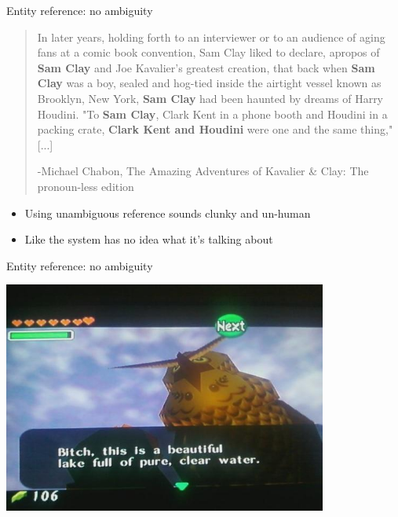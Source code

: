 \documentclass[10pt, compress]{beamer}		%
\begin{document}
\begin{frame}{Entity reference: no ambiguity}
	\begin{quote}
		In later years, holding forth to an interviewer or to an audience of aging fans at a comic book convention, Sam Clay liked to declare, apropos of \textbf{Sam Clay} and Joe Kavalier's greatest creation, that back when \textbf{Sam Clay} was a boy, sealed and hog-tied inside the airtight vessel known as Brooklyn, New York, \textbf{Sam Clay} had been haunted by dreams of Harry Houdini. "To \textbf{Sam Clay}, Clark Kent in a phone booth and Houdini in a packing crate, \textbf{Clark Kent and Houdini} were one and the same thing,"[...]

		\medskip
		-Michael Chabon, The Amazing Adventures of Kavalier \& Clay: The pronoun-less edition
	\end{quote}

	\begin{itemize}
		\item Using unambiguous reference sounds clunky and un-human \pause
		\item Like the system has no idea what it's talking about
	\end{itemize}
\end{frame}

\begin{frame}{Entity reference: no ambiguity}
	\begin{center}
		\includegraphics[width=0.8\textwidth]{images/zeldabitch.jpg}	%
	\end{center}
\end{frame}
\end{document}
